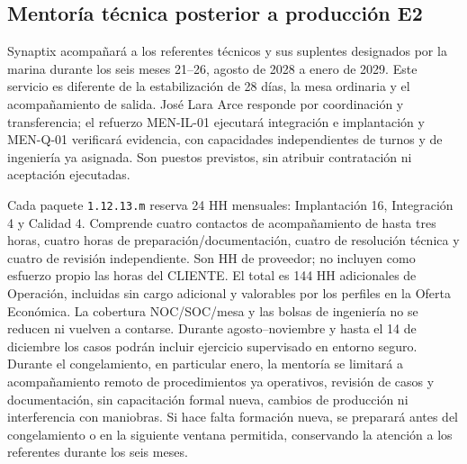 \subsection{Mentoría técnica posterior a producción E2} %
Synaptix acompañará a los referentes técnicos y sus suplentes designados por la marina durante los seis meses 21--26, agosto de 2028 a enero de 2029. Este servicio es diferente de la estabilización de 28 días, la mesa ordinaria y el acompañamiento de salida. José Lara Arce responde por coordinación y transferencia; el refuerzo MEN-IL-01 ejecutará integración e implantación y MEN-Q-01 verificará evidencia, con capacidades independientes de turnos y de ingeniería ya asignada. Son puestos previstos, sin atribuir contratación ni aceptación ejecutadas.

Cada paquete \texttt{1.12.13.m} reserva 24 HH mensuales: Implantación 16, Integración 4 y Calidad 4. Comprende cuatro contactos de acompañamiento de hasta tres horas, cuatro horas de preparación/documentación, cuatro de resolución técnica y cuatro de revisión independiente. Son HH de proveedor; no incluyen como esfuerzo propio las horas del CLIENTE. El total es 144 HH adicionales de Operación, incluidas sin cargo adicional y valorables por los perfiles en la Oferta Económica. La cobertura NOC/SOC/mesa y las bolsas de ingeniería no se reducen ni vuelven a contarse.
Durante agosto--noviembre y hasta el 14 de diciembre los casos podrán incluir ejercicio supervisado en entorno seguro. Durante el congelamiento, en particular enero, la mentoría se limitará a acompañamiento remoto de procedimientos ya operativos, revisión de casos y documentación, sin capacitación formal nueva, cambios de producción ni interferencia con maniobras. Si hace falta formación nueva, se preparará antes del congelamiento o en la siguiente ventana permitida, conservando la atención a los referentes durante los seis meses.

